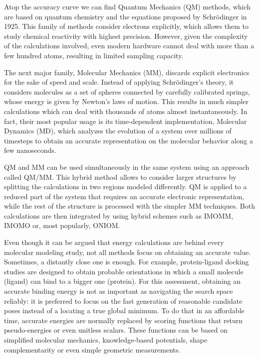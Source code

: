 

Atop the accuracy curve we can find Quantum Mechanics (QM) methods, which are based on quantum chemistry and the equations proposed by Schrödinger in 1925. This family of methods consider electrons explicitly, which allows them to study chemical reactivity with highest precision. However, given the complexity of the calculations involved, even modern hardware cannot deal with more than a few hundred atoms, resulting in limited sampling capacity.

The next major family, Molecular Mechanics (MM), discards explicit electronics for the sake of speed and scale. Instead of applying Schrödinger’s theory, it considers molecules as a set of spheres connected by carefully calibrated springs, whose energy is given by Newton’s laws of motion. This results in much simpler calculations which can deal with thousands of atoms almost instantaneously. In fact, their most popular usage is its time-dependent implementation, Molecular Dynamics (MD), which analyzes the evolution of a system over millions of timesteps to obtain an accurate representation on the molecular behavior along a few nanoseconds.

QM and MM can be used simultaneously in the same system using an approach called QM/MM. This hybrid method allows to consider larger structures by splitting the calculations in two regions modeled differently. QM is applied to a reduced part of the system that requires an accurate electronic representation, while the rest of the structure is processed with the simpler MM techniques. Both calculations are then integrated by using hybrid schemes such as IMOMM,\cite{maseras1995imomm} IMOMO\cite{humbel1996imomo} or, most popularly, ONIOM.\cite{svensson1996oniom}

Even though it can be argued that energy calculations are behind every molecular modeling study, not all methods focus on obtaining an accurate value. Sometimes, a distantly close one is enough. For example, protein-ligand docking studies are designed to obtain probable orientations in which a small molecule (ligand) can bind to a bigger one (protein). For this assessment, obtaining an accurate binding energy is not as important as navigating the search space reliably: it is preferred to focus on the fast generation of reasonable candidate poses instead of a locating a true global minimum. To do that in an affordable time, accurate energies are normally replaced by scoring functions that return pseudo-energies or even unitless scalars. These functions can be based on simplified molecular mechanics, knowledge-based potentials, shape complementarity or even simple geometric measurements.

